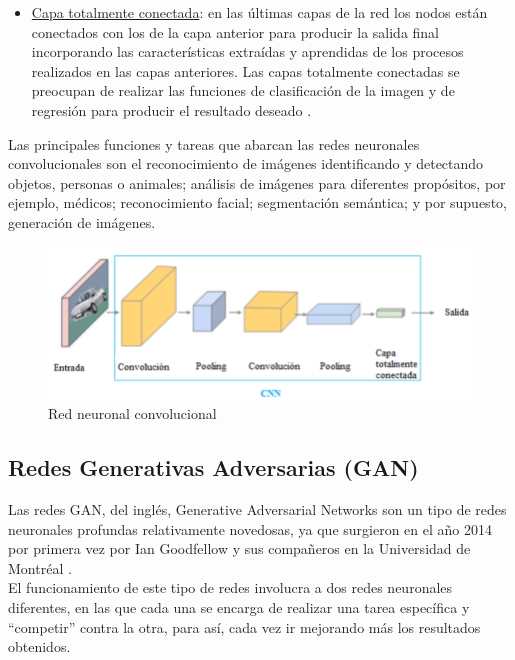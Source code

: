 \begin{itemize}
	\item \underline{Capa totalmente conectada}: en las últimas capas de la red los nodos están conectados con los de la capa anterior para producir la salida final incorporando las características extraídas y aprendidas de los procesos realizados en las capas anteriores. Las capas totalmente conectadas se preocupan de realizar las funciones de clasificación de la imagen y de regresión para producir el resultado deseado \citep{krizhevsky2017imagenet}. \\
	

\end{itemize}

	Las principales funciones y tareas que abarcan las redes neuronales convolucionales son el reconocimiento de imágenes identificando y detectando objetos, personas o animales; análisis de imágenes para diferentes propósitos, por ejemplo, médicos; reconocimiento facial; segmentación semántica; y por supuesto, generación de imágenes.\\
\begin{figure}[h]
	\centering
	\includegraphics[width = 1 \textwidth]{Imagenes/Vectorial/cnn.png}
	\caption{Red neuronal convolucional \citep{fotocnn}}
	\label{fig:cnn}
\end{figure}

\subsection{Redes Generativas Adversarias (GAN)}

Las redes GAN, del inglés, Generative Adversarial Networks son un tipo de redes neuronales profundas relativamente novedosas, ya que surgieron en el año 2014 por primera vez por Ian Goodfellow y sus compañeros en la Universidad de Montréal \citep{goodfellow2014generative}. \\

El funcionamiento de este tipo de redes involucra a dos redes neuronales diferentes, en las que cada una se encarga de realizar una tarea específica y “competir” contra la otra, para así, cada vez ir mejorando más los resultados obtenidos. \\

